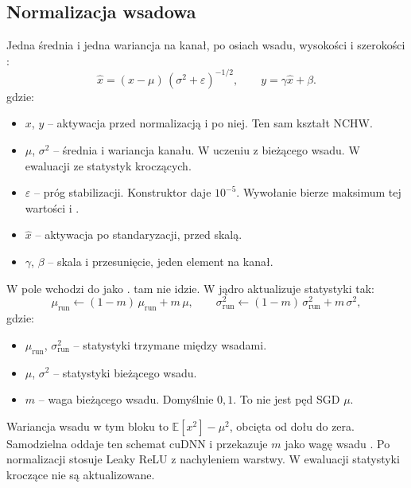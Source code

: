 \subsection{Normalizacja wsadowa}

Jedna średnia i jedna wariancja na kanał, po osiach wsadu, wysokości i szerokości \cite{ioffe2015batch}:
\begin{equation}
\label{eq:bn}
\hat{x} = (x - \mu)\,(\sigma^2 + \varepsilon)^{-1/2},
\qquad
y = \gamma \hat{x} + \beta.
\end{equation}
gdzie:
\begin{itemize}
\item \(x\), \(y\) -- aktywacja przed normalizacją i po niej. Ten sam kształt NCHW.
\item \(\mu\), \(\sigma^2\) -- średnia i wariancja kanału. W uczeniu z bieżącego wsadu. W ewaluacji ze statystyk kroczących.
\item \(\varepsilon\) -- próg stabilizacji. Konstruktor daje \(10^{-5}\). Wywołanie bierze maksimum tej wartości i .
\item \(\hat{x}\) -- aktywacja po standaryzacji, przed skalą.
\item \(\gamma\), \(\beta\) -- skala i przesunięcie, jeden element na kanał.
\end{itemize}

W  pole  wchodzi do  jako .  tam nie idzie. W  jądro aktualizuje statystyki tak:
\begin{equation}
\label{eq:bn-run}
\mu_{\mathrm{run}} \leftarrow (1 - m)\,\mu_{\mathrm{run}} + m\,\mu,
\qquad
\sigma^2_{\mathrm{run}} \leftarrow (1 - m)\,\sigma^2_{\mathrm{run}} + m\,\sigma^2,
\end{equation}
gdzie:
\begin{itemize}
\item \(\mu_{\mathrm{run}}\), \(\sigma^2_{\mathrm{run}}\) -- statystyki trzymane między wsadami.
\item \(\mu\), \(\sigma^2\) -- statystyki bieżącego wsadu.
\item \(m\) -- waga bieżącego wsadu. Domyślnie \(0{,}1\). To nie jest pęd SGD \(\mu\).
\end{itemize}

Wariancja wsadu w tym bloku to \(\mathbb{E}[x^2] - \mu^2\), obcięta od dołu do zera. Samodzielna  oddaje ten schemat cuDNN i przekazuje \(m\) jako wagę wsadu \cite{nvidia-cudnn}. Po normalizacji  stosuje Leaky ReLU z nachyleniem warstwy. W ewaluacji statystyki kroczące nie są aktualizowane.

